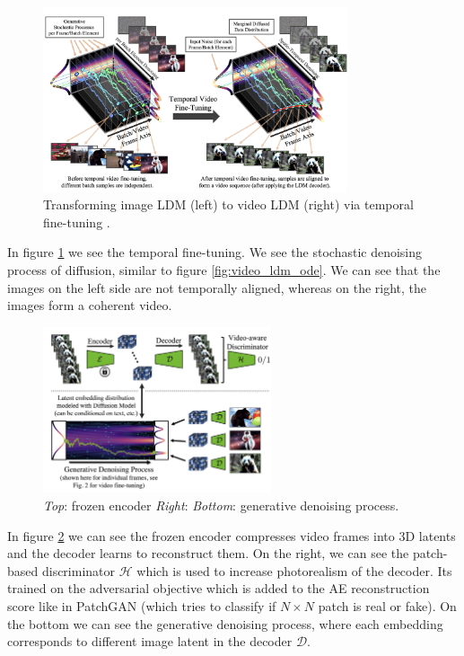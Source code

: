 \begin{figure}
    \centering
    \includegraphics[width=0.8\textwidth]{images/video_ldm/image_to_video_tuning.png}
    \caption{Transforming image LDM (left) to video LDM (right) via temporal fine-tuning \cite{video_ldm}.}
    \label{fig:video_ldm_image_to_video_tuning}
\end{figure}

In figure \ref{fig:video_ldm_image_to_video_tuning} we see the temporal fine-tuning. We see the stochastic denoising process of diffusion, similar to figure \ref{fig:video_ldm_ode}. We can see that the images on the left side are not temporally aligned, whereas on the right, the images form a coherent video.

\begin{figure}
    \centering
    \includegraphics[width=0.6\textwidth]{images/video_ldm/enc_dec_denoise_process.png}
    \caption{\textit{Top}: frozen encoder \textit{Right}:  \textit{Bottom}: generative denoising process. \cite{video_ldm}}
    \label{fig:video_ldm_enc_dec_denoise_process}
\end{figure}

In figure \ref{fig:video_ldm_enc_dec_denoise_process} we can see the frozen encoder compresses video frames into 3D latents and the decoder learns to reconstruct them. On the right, we can see the patch-based discriminator $\mathcal{H}$ which is used to increase photorealism of the decoder. Its trained on the adversarial objective which is added to the AE reconstruction score like in PatchGAN \cite{isola2017image} (which tries to classify if $N \times N$ patch is real or fake). On the bottom we can see the generative denoising process, where each embedding corresponds to different image latent in the decoder $\mathcal{D}$.

